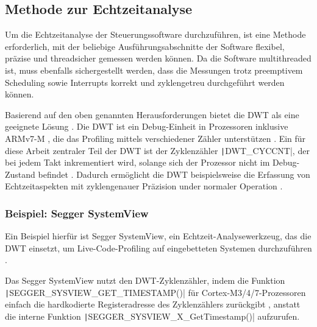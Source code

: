 \subsection{Methode zur Echtzeitanalyse} \label{sec:dwt}

Um die Echtzeitanalyse der Steuerungssoftware durchzuführen, ist eine Methode
erforderlich, mit der beliebige Ausführungsabschnitte der Software flexibel,
präzise und threadsicher gemessen werden können. Da die Software multithreaded
ist, muss ebenfalls sichergestellt werden, dass die Messungen trotz preemptivem
Scheduling sowie Interrupts korrekt und zyklengetreu durchgeführt werden können.

Basierend auf den oben genannten Herausforderungen bietet die \ac{DWT} als eine
geeignete Lösung \cite{ARM_KA001499}. Die DWT ist ein Debug-Einheit in
Prozessoren inklusive ARMv7-M \cite{ARMv7_ref_man_dwt_about}, die das Profiling
mittels verschiedener Zähler unterstützen \cite{ARMv7_ref_man_dwt_profiling}.
Ein für diese Arbeit zentraler Teil der DWT ist der Zyklenzähler
\texttt|DWT_CYCCNT|, der bei jedem Takt inkrementiert wird, solange sich
der Prozessor nicht im Debug-Zustand befindet \cite{ARMv7_ref_man_dwt_cycle}.
Dadurch ermöglicht die DWT beispielsweise die Erfassung von Echtzeitaspekten mit
zyklengenauer Präzision under normaler Operation \cite{ARMv7_ref_man_dwt}.

\subsubsection{Beispiel: Segger SystemView}

Ein Beispiel hierfür ist Segger SystemView, ein Echtzeit-Analysewerkzeug, das
die DWT einsetzt, um Live-Code-Profiling auf eingebetteten Systemen
durchzuführen \cite{SEGGER_SystemView}.

Das Segger SystemView nutzt den DWT-Zyklenzähler, indem die Funktion \linebreak
\texttt|SEGGER_SYSVIEW_GET_TIMESTAMP()| für Cortex-M3/4/7-Prozessoren
einfach die hardkodierte Registeradresse des Zyklenzählers zurückgibt \cite[S.
65]{Segger_SystemView_manual}\cite{Arm_DWT_Programmers_Model}, anstatt die
interne Funktion \texttt|SEGGER_SYSVIEW_X_GetTimestamp()| aufzurufen.
